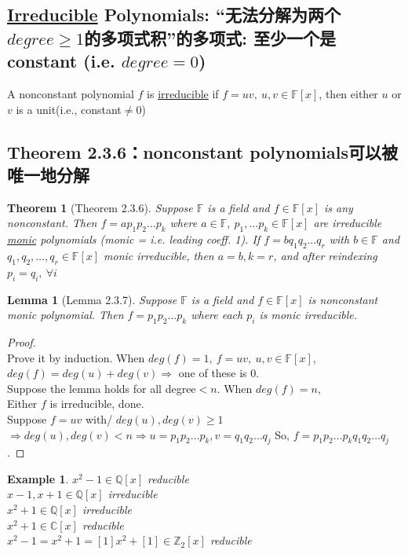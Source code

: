 \documentclass[11pt,a4paper]{article}
\newtheorem{theorem}{Theorem}
\newtheorem{lemma}{Lemma}
\newtheorem{example}{Example}
\begin{document}
\subsection{\underline{Irreducible} Polynomials: “无法分解为两个$degree\geq1$的多项式积”的多项式: 至少一个是constant (i.e. $degree=0$)}
A nonconstant polynomial $f$ is \underline{irreducible} if $f=uv,\ u,v\in\mathbb{F}[x]$, then either $u$ or $v$ is a unit(i.e., constant$\neq0$)


\subsection{Theorem 2.3.6：nonconstant polynomials可以被唯一地分解}
\begin{theorem}[Theorem 2.3.6]
Suppose $\mathbb{F}$ is a field and $f\in\mathbb{F}[x]$ is any nonconstant. Then $f = ap_1p_2\dots p_k$ where $a \in \mathbb{F},\ p_1,\dots p_k \in \mathbb{F}[x]$ are irreducible \underline{monic} polynomials (monic = i.e. leading coeff. 1). If $f = bq_1q_2\dots q_r$ with $b \in \mathbb{F}$ and
$q_1,q_2,\dots ,q_r \in \mathbb{F}[x]$ monic irreducible, then $a = b, k = r$, and after reindexing $p_i = q_i,\ \forall i$
\end{theorem}


\begin{lemma}[Lemma 2.3.7]
    Suppose $\mathbb{F}$ is a field and $f\in\mathbb{F}[x]$ is nonconstant monic polynomial. Then $f = p_1p_2\dots p_k$ where each $p_i$ is monic irreducible.
\end{lemma}
\begin{proof}
\quad\\
Prove it by induction. When $deg(f)=1,\ f=uv,\ u,v\in\mathbb{F}[x]$, $deg(f)=deg(u)+deg(v)\Rightarrow$ one of these is 0.\\
Suppose the lemma holds for all degree$<n$. When $deg(f)=n$,\\
Either $f$ is irreducible, done.\\
Suppose $f = uv$ with/ $deg(u), deg(v)\geq 1$\\
$\Rightarrow deg(u),deg(v)<n\Rightarrow u=p_1p_2\dots p_k, v=q_1q_2\dots q_j$
So, $f = p_1p_2\dots p_kq_1q_2\dots q_j$.
\end{proof}
\begin{example}
$x^2-1\in\mathbb{Q}[x]$ reducible\\
$x-1,x+1\in\mathbb{Q}[x]$ irreducible\\
$x^2+1\in\mathbb{Q}[x]$ irreducible\\
$x^2+1\in\mathbb{C}[x]$ reducible\\
$x^2-1=x^2+1=[1]x^2+[1]\in\mathbb{Z}_2[x]$ reducible\\
\end{example}
\end{document}
